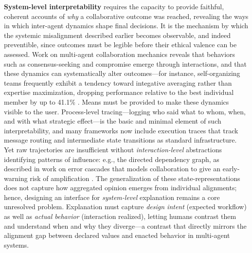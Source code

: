 \documentclass[11pt,a4paper]{article}
\begin{document}
\textbf{System-level interpretability} requires the capacity to provide faithful, coherent accounts of \emph{why} a collaborative outcome was reached, revealing the ways in which inter-agent dynamics shape final decisions. It is the mechanism by which the systemic misalignment described earlier becomes observable, and indeed preventible, since outcomes must be legible before their ethical valence can be assessed. Work on multi-agent collaboration mechanics reveals that behaviors such as consensus-seeking and compromise emerge through interactions, and that these dynamics can systematically alter outcomes---for instance, self-organizing teams frequently exhibit a tendency toward integative averaging rather than expertise maximization, dropping performance relative to the best individual member by up to 41.1\% \cite{arxiv:2602.01011v4}. Means must be provided to make these dynamics visible to the user. Process-level tracing---logging who said what to whom, when, and with what strategic effect---is the basic and minimal element of such interpretability, and many frameworks now include execution traces that track message routing and intermediate state transitions as standard infrastructure. Yet raw trajectories are insufficient without \emph{interaction-level} abstractions identifying patterns of influence: e.g., the directed dependency graph, as described in work on error cascades that models collaboration to give an early-warning risk of amplification \cite{arxiv:2603.04474v2}. The generalization of these state-representations does not capture how aggregated opinion emerges from individual alignments; hence, designing an interface for \emph{system-level} explanation remains a core unresolved problem. Explanation must capture \emph{design intent} (expected workflow) as well as \emph{actual behavior} (interaction realized), letting humans contrast them and understand when and why they diverge---a contrast that directly mirrors the alignment gap between declared values and enacted behavior in multi-agent systems.
\end{document}
